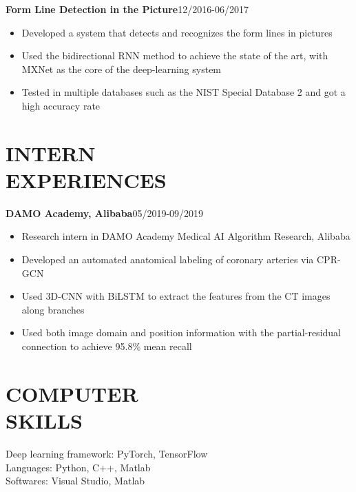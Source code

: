 \documentclass[margin]{res}
\begin{document}
\begin{resume}
                \textbf{Form Line Detection in the Picture}\hfill 12/2016-06/2017
                \begin{itemize}\itemsep -2.2pt %
                 \item Developed a system that detects and recognizes the form lines in pictures
                 \item Used the bidirectional RNN method to achieve the state of the art, with MXNet as the core of the deep-learning system
                 \item Tested in multiple databases such as the NIST Special Database 2 and got a high accuracy rate
                 \end{itemize}

\section{INTERN \\ EXPERIENCES}
                \textbf{DAMO Academy, Alibaba}\hfill 05/2019-09/2019
                \begin{itemize}\itemsep -2.2pt %
                 \item Research intern in DAMO Academy Medical AI Algorithm Research, Alibaba
                 \item Developed an automated anatomical labeling of coronary arteries via CPR-GCN
                 \item Used 3D-CNN with BiLSTM to extract the features from the CT images along branches
                 \item Used both image domain and position information with the partial-residual connection to achieve 95.8\% mean recall
                 \end{itemize}
\section{COMPUTER \\ SKILLS} 
Deep learning framework: PyTorch, TensorFlow\\
Languages: Python, C++, Matlab \\
Softwares: Visual Studio, Matlab 



\end{resume}
\end{document}
